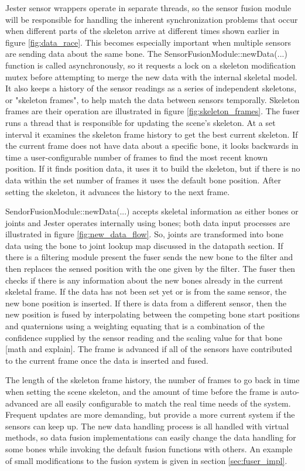 Jester sensor wrappers operate in separate threads, so the sensor fusion module will be responsible for handling the inherent synchronization problems that occur when different parts of the skeleton arrive at different times shown earlier in figure \ref{fig:data_race}. This becomes especially important when multiple sensors are sending data about the same bone. The SensorFusionModule::newData(...) function is called asynchronously, so it requests a lock on a skeleton modification mutex before attempting to merge the new data with the internal skeletal model. It also keeps a history of the sensor readings as a series of independent skeletons, or "skeleton frames", to help match the data between sensors temporally. Skeleton frames are their operation are illustrated in figure \ref{fig:skeleton_frames}. The fuser runs a thread that is responsible for updating the scene's skeleton. At a set interval it examines the skeleton frame history to get the best current skeleton. If the current frame does not have data about a specific bone, it looks backwards in time a user-configurable number of frames to find the most recent known position. If it finds position data, it uses it to build the skeleton, but if there is no data within the set number of frames it uses the default bone position. After setting the skeleton, it advances the history to the next frame. 

SendorFusionModule::newData(...) accepts skeletal information as either bones or joints and Jester operates internally using bones; both data input processes are illustrated in figure \ref{fig:new_data_flow}. So, joints are transformed into bone data using the bone to joint lookup map discussed in the datapath section. If there is a filtering module present the fuser sends the new bone to the filter and then replaces the sensed position with the one given by the filter. The fuser then checks if there is any information about the new bones already in the current skeletal frame. If the data has not been set yet or is from the same sensor, the new bone position is inserted. If there is data from a different sensor, then the new position is fused by interpolating between the competing bone start positions and quaternions using a weighting equating that is a combination of the confidence supplied by the sensor reading and the scaling value for that bone [math and explain]. The frame is advanced if all of the sensors have contributed to the current frame once the data is inserted and fused. 

The length of the skeleton frame history, the number of frames to go back in time when setting the scene skeleton, and the amount of time before the frame is auto-advanced are all easily configurable to match the real time needs of the system. Frequent updates are more demanding, but provide a more current system if the sensors can keep up. The new data handling process is all handled with virtual methods, so data fusion implementations can easily change the data handling for some bones while invoking the default fusion functions with others. An example of small modifications to the fusion system is given in section \ref{sec:fuser_impl}.
	
